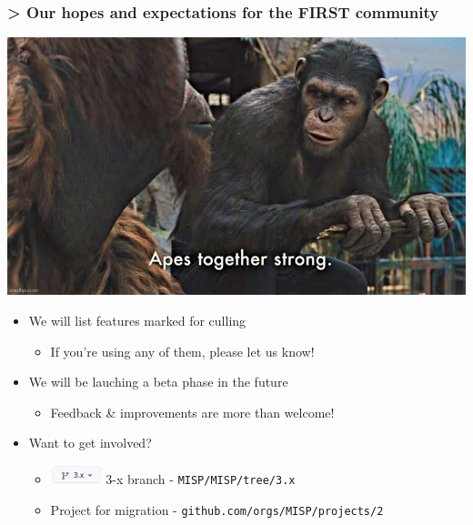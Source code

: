 \begin{frame}
    \frametitle{> Our hopes and expectations for the FIRST community}
    \begin{center}
        \includegraphics[width=0.50\linewidth]{pictures/apes-together-strong.jpeg}
    \end{center}
    \begin{itemize}
        \item We will list features marked for culling
        \begin{itemize}
            \item If you're using any of them, please let us know!
        \end{itemize}
        \item We will be lauching a beta phase in the future
        \begin{itemize}
            \item Feedback \& improvements are more than welcome!
        \end{itemize}
        \item Want to get involved?
        \begin{itemize}
            \item \includegraphics[width=4em]{pictures/3x-branch.png} 3-x branch - \texttt{\scriptsize MISP/MISP/tree/3.x}
            \item {} Project for migration - \texttt{\scriptsize github.com/orgs/MISP/projects/2}
        \end{itemize}
    \end{itemize}
\end{frame}
